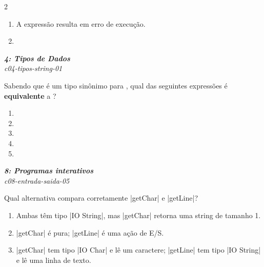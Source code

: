\documentclass[a4paper,10pt,brazil]{article}
\begin{document}
\begin{multicols}{2}
\begin{enumerate}
  \item A expressão resulta em erro de execução.

  \item {}


\end{enumerate}

\begin{flushright}
  \footnotesize
  \textit{\textbf{4: Tipos de Dados}}\\
  \textit{c04-tipos-string-01}\\

\end{flushright}
Sabendo que  é um tipo sinônimo para \haskellinline{[Char]}, qual das seguintes expressões é \textbf{equivalente} a ?

\begin{enumerate}
  \item \haskellinline{["F", "P"]}

  \item {}

  \item {}

  \item {}

  \item \haskellinline{['F', 'P']}


\end{enumerate}

\begin{flushright}
  \footnotesize
  \textit{\textbf{8: Programas interativos}}\\
  \textit{c08-entrada-saida-05}\\

\end{flushright}
Qual alternativa compara corretamente \haskellinline|getChar| e \haskellinline|getLine|?

\begin{enumerate}
  \item Ambas têm tipo \haskellinline|IO String|, mas \haskellinline|getChar| retorna uma string de tamanho 1.

  \item \haskellinline|getChar| é pura; \haskellinline|getLine| é uma ação de E/S.

  \item \haskellinline|getChar| tem tipo \haskellinline|IO Char| e lê um caractere; \haskellinline|getLine| tem tipo \haskellinline|IO String| e lê uma linha de texto.


\end{enumerate}
\end{multicols}
\end{document}
